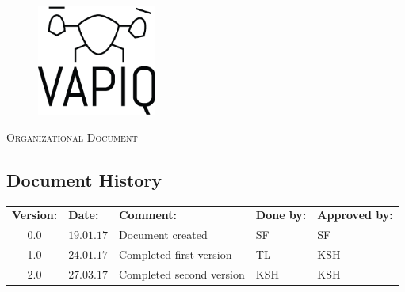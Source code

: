 \documentclass{article}
\author{Aleksander Holthe  \\ Katrine Sundal Haune \\ Kent Kjeldaas \\ Stian Fredriksen \\ Tomas Lyngroth \\ Vanja Katinka Halvorsen}
\makeatletter
\let\vapiqteam\@author
\makeatother
\begin{document}
\begin{titlepage}
    \centering
    \pagecolor{gainsboro}
	\\[3.0 cm]
    \begin{figure}[h]
        \centering
        \includegraphics[width = 0.35\textwidth]{VAPIQ-PICTURES//Logo2_Tilted.png}
        \\[2.0 cm] 
    \end{figure}                              
    \textsc{\Huge Organizational Document}  
    \\[4.0 cm]
	\large \vapiqteam      
\end{titlepage}
\pagecolor{white}


\begin{center}
\section*{\textbf{Document History}}
\begin{tabular}{cllll}
\rowcolor{cadetgrey}
\textbf{Version:}    &\textbf{Date:} 	 &\textbf{Comment:}    &\textbf{Done by:}   &\textbf{Approved by:}  \\

0.0       & $19.01.17$       & Document created  & SF    & SF          \\ \rowcolor{gainsboro}
1.0       & $24.01.17$       & Completed first version  & TL    & KSH          \\
2.0       & $27.03.17$       & Completed second version  & KSH    & KSH          \\

\end{tabular}                                                                   
\end{center}
\end{document}
